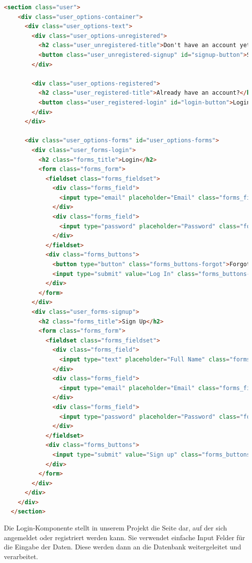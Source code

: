 \begin{lstlisting}[language=HTML, caption=Login Komponente]
    <section class="user">
    <div class="user_options-container">
      <div class="user_options-text">
        <div class="user_options-unregistered">
          <h2 class="user_unregistered-title">Don't have an account yet?</h2>
          <button class="user_unregistered-signup" id="signup-button">Sign up</button>
        </div>
  
        <div class="user_options-registered">
          <h2 class="user_registered-title">Already have an account?</h2>
          <button class="user_registered-login" id="login-button">Login</button>
        </div>
      </div>
  
      <div class="user_options-forms" id="user_options-forms">
        <div class="user_forms-login">
          <h2 class="forms_title">Login</h2>
          <form class="forms_form">
            <fieldset class="forms_fieldset">
              <div class="forms_field">
                <input type="email" placeholder="Email" class="forms_field-input" required autofocus />
              </div>
              <div class="forms_field">
                <input type="password" placeholder="Password" class="forms_field-input" required />
              </div>
            </fieldset>
            <div class="forms_buttons">
              <button type="button" class="forms_buttons-forgot">Forgot password?</button>
              <input type="submit" value="Log In" class="forms_buttons-action">
            </div>
          </form>
        </div>
        <div class="user_forms-signup">
          <h2 class="forms_title">Sign Up</h2>
          <form class="forms_form">
            <fieldset class="forms_fieldset">
              <div class="forms_field">
                <input type="text" placeholder="Full Name" class="forms_field-input" required />
              </div>
              <div class="forms_field">
                <input type="email" placeholder="Email" class="forms_field-input" required />
              </div>
              <div class="forms_field">
                <input type="password" placeholder="Password" class="forms_field-input" required />
              </div>
            </fieldset>
            <div class="forms_buttons">
              <input type="submit" value="Sign up" class="forms_buttons-action">
            </div>
          </form>
        </div>
      </div>
    </div>
  </section>  
\end{lstlisting}

Die Login-Komponente stellt in unserem Projekt die Seite dar, auf der sich angemeldet oder registriert werden kann. Sie verwendet einfache Input Felder für die Eingabe der Daten. Diese werden dann an die Datenbank weitergeleitet und verarbeitet.

